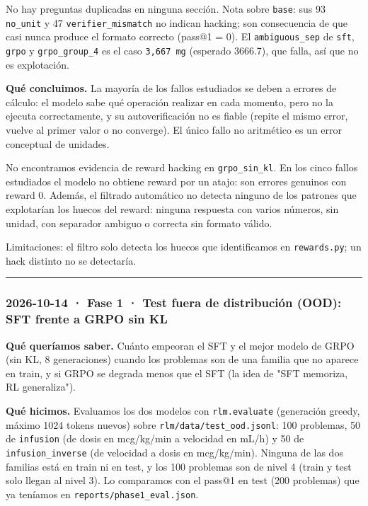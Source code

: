 No hay preguntas duplicadas en ninguna sección. Nota sobre \texttt{base}: sus 93 \texttt{no\_\allowbreak{}unit} y 47 \texttt{verifier\_\allowbreak{}mismatch} no indican hacking; son consecuencia de que casi nunca produce el formato correcto (pass@1 = 0). El \texttt{ambiguous\_\allowbreak{}sep} de \texttt{sft}, \texttt{grpo} y \texttt{grpo\_\allowbreak{}group\_\allowbreak{}4} es el caso \texttt{3,667 mg} (esperado 3666.7), que falla, así que no es explotación.

\textbf{Qué concluimos.} La mayoría de los fallos estudiados se deben a errores de cálculo: el modelo sabe qué operación realizar en cada momento, pero no la ejecuta correctamente, y su autoverificación no es fiable (repite el mismo error, vuelve al primer valor o no converge). El único fallo no aritmético es un error conceptual de unidades.

No encontramos evidencia de reward hacking en \texttt{grpo\_\allowbreak{}sin\_\allowbreak{}kl}. En los cinco fallos estudiados el modelo no obtiene reward por un atajo: son errores genuinos con reward 0. Además, el filtrado automático no detecta ninguno de los patrones que explotarían los huecos del reward: ninguna respuesta con varios números, sin unidad, con separador ambiguo o correcta sin formato válido.

Limitaciones: el filtro solo detecta los huecos que identificamos en \texttt{rewards.py}; un hack distinto no se detectaría.

\begin{center}\rule{0.5\linewidth}{0.5pt}\end{center}

\subsubsection{2026-10-14 · Fase 1 · Test fuera de distribución (OOD): SFT frente a GRPO sin KL}

\textbf{Qué queríamos saber.} Cuánto empeoran el SFT y el mejor modelo de GRPO (sin KL, 8
generaciones) cuando los problemas son de una familia que no aparece en train, y si GRPO se
degrada menos que el SFT (la idea de "SFT memoriza, RL generaliza").

\textbf{Qué hicimos.} Evaluamos los dos modelos con \texttt{rlm.evaluate} (generación greedy, máximo 1024
tokens nuevos) sobre \texttt{rlm/\allowbreak{}data/\allowbreak{}test\_\allowbreak{}ood.jsonl}: 100 problemas, 50 de \texttt{infusion} (de dosis en
mcg/kg/min a velocidad en mL/h) y 50 de \texttt{infusion\_\allowbreak{}inverse} (de velocidad a dosis en
mcg/kg/min). Ninguna de las dos familias está en train ni en test, y los 100 problemas son de
nivel 4 (train y test solo llegan al nivel 3). Lo comparamos con el pass@1 en test (200
problemas) que ya teníamos en \texttt{reports/\allowbreak{}phase1\_\allowbreak{}eval.json}.

